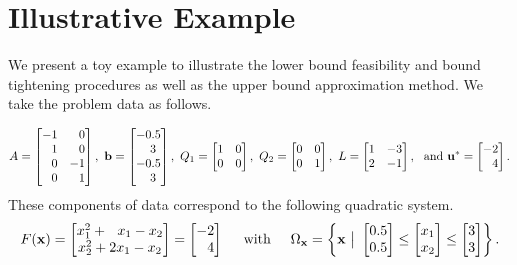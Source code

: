 \section{Illustrative Example} \label{sec:expl}

We present a toy example to illustrate the lower bound feasibility and bound tightening procedures as well as the upper bound approximation method.
We take the problem data as follows.

\[
A=
\begin{bmatrix}
  -1 & \p 0  \\ 
\p 1 & \p 0  \\  
\p 0 & -1 \\
\p 0 & \p 1  
\end{bmatrix},%
~
\vb =
\begin{bmatrix}
  -0.5  \\ 
\p 3 \\  
  -0.5 \\
\p 3  
\end{bmatrix}, %
~
Q_1=
\begin{bmatrix}
  1 & 0  \\ 
  0 & 0  
\end{bmatrix},%
~
Q_2=
\begin{bmatrix}
  0 & 0  \\ 
  0 & 1  
\end{bmatrix},%
~
L=
\begin{bmatrix}
  1 & -3  \\ 
  2 & -1  
\end{bmatrix}, %
~\mbox{ and }
\vu^*=
\begin{bmatrix}
  -2  \\ 
\p 4   
\end{bmatrix}.%
\]
%
These components of data correspond to the following quadratic system.
\[
F(\vx) =
\begin{bmatrix}
  x_1^2 + ~~x_1 - x_2 \\
  x_2^2 +  2x_1 - x_2
\end{bmatrix}
=
\begin{bmatrix}
    -2 \\
    \p 4
\end{bmatrix}
\hspace*{0.15in}
\text{ with }
\hspace*{0.15in}
\Omega_{\vx} = \left\{ \vx ~\big\vert~
\begin{bmatrix}
  0.5 \\
  0.5
\end{bmatrix}
\leq 
\begin{bmatrix}
  x_1 \\
  x_2
\end{bmatrix}
\leq
\begin{bmatrix}
  3 \\
  3
\end{bmatrix}
\right\}.
\]

